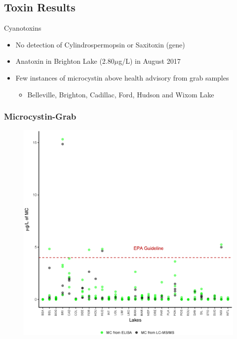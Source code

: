 \subsection{Toxin Results}
\begin{frame}{Cyanotoxins}
	\begin{itemize}
		\item No detection of Cylindrospermopsin or Saxitoxin (gene)
		\item Anatoxin in Brighton Lake (2.80$\mu$g/L) in August 2017
		\item Few instances of microcystin above health advisory from grab samples
			\begin{itemize}
				\item Belleville, Brighton, Cadillac, Ford, Hudson and Wixom Lake
				
			\end{itemize}

			
	\end{itemize}
\end{frame}
\begin{frame}
	\frametitle{Microcystin-Grab}


	\begin{figure}
		\includegraphics[width=\textwidth,height=0.9\textheight]{../figures/Microcystin.eps}
	\end{figure}

\end{frame}
